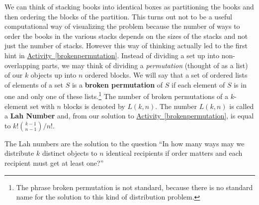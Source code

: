 \documentclass[10pt,]{book}
\newcommand{\terminology}[1]{\textbf{#1}}
\theoremstyle{plain}
\theoremstyle{definition}
\theoremstyle{definition}
\theoremstyle{definition}
\theoremstyle{definition}
\numberwithin{equation}{chapter}
\begin{document}
We can think of stacking books into identical boxes as partitioning the books and then ordering the blocks of the partition. This turns out not to be a useful computational way of visualizing the problem because the number of ways to order the books in the various stacks depends on the sizes of the stacks and not just the number of stacks. However this way of thinking actually led to the first hint in \hyperref[brokenpermutation]{Activity~\ref{brokenpermutation}}. Instead of dividing a set up into non-overlapping parts, we may think of dividing a \emph{permutation} (thought of as a list) of our \(k\) objects up into \(n\) ordered blocks. We will say that a set of ordered lists of elements of a set \(S\) is a \terminology{broken permutation}   of \(S\) if each element of \(S\) is in one and only one of these lists.\footnote{The phrase broken permutation is not standard, because there is no standard name for the solution to this kind  of distribution problem.\label{fn-7}} The number of broken permutations of a \(k\)-element set with \(n\) blocks is denoted by \(L(k,n)\). The number \(L(k,n)\) is called a \terminology{Lah Number} and, from our solution to \hyperref[brokenpermutation]{Activity~\ref{brokenpermutation}}, is equal to \(k!\binom{k-1}{n-1}/n!\).%
\par
\hypertarget{p-784}{}%
The Lah numbers are the solution to the question ``In how many ways may we distribute \(k\) distinct objects to \(n\) identical recipients if order matters and each recipient must get at least one?''%
\typeout{************************************************}
\typeout{************************************************}
\end{document}
